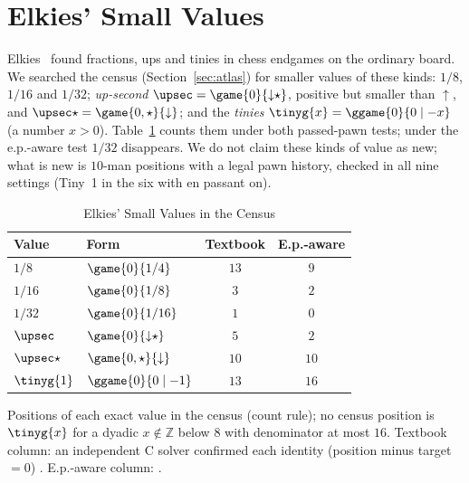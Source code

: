 \section{Elkies' Small Values}\label{sec:targets}

Elkies~\cite{Elkies1996} found fractions, ups and tinies in chess endgames on the ordinary board. We searched
the census (Section~\ref{sec:atlas}) for smaller values of these kinds: $1/8$, $1/16$ and $1/32$;
\emph{up-second} $\upsec=\game{0}{{\downarrow}\star}$, positive but smaller than ${\uparrow}$, and
$\upsec\star=\game{0,\star}{{\downarrow}}$; and the \emph{tinies} $\tinyg{x}=\ggame{0}{0\mid -x}$ (a number $x>0$).
Table~\ref{tab:targets} counts them under both passed-pawn tests; under the e.p.-aware test $1/32$
disappears. We do not claim these kinds of value as new; what is new is $10$-man positions with a legal pawn
history, checked in all nine settings (Tiny~1 in the six with en passant on).

\begin{table}[!t]
\caption{Elkies' Small Values in the Census}
\label{tab:targets}
\centering
\begin{tabular}{@{}llcc@{}}
\toprule
Value & Form & Textbook & E.p.-aware \\
\midrule
$1/8$ & $\game{0}{1/4}$ & $13$ & $9$ \\
$1/16$ & $\game{0}{1/8}$ & $3$ & $2$ \\
$1/32$ & $\game{0}{1/16}$ & $1$ & $0$ \\
$\upsec$ & $\game{0}{{\downarrow}\star}$ & $5$ & $2$ \\
$\upsec\star$ & $\game{0,\star}{{\downarrow}}$ & $10$ & $10$ \\
$\tinyg{1}$ & $\ggame{0}{0\mid -1}$ & $13$ & $16$ \\
\bottomrule
\end{tabular}

\smallskip
\parbox{\columnwidth}{\footnotesize Positions of each exact value in the census (count rule); no census position
is $\tinyg{x}$ for a dyadic $x\notin\mathbb{Z}$ below $8$ with denominator at most $16$. Textbook column: an independent C solver confirmed each identity
(position minus target $=0$) . E.p.-aware column: .}
\end{table}

